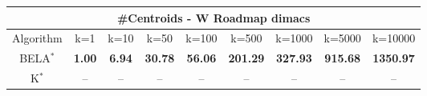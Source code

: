 \begin{tabular}{c|cccccccc}\toprule
\multicolumn{9}{c}{#Centroids - W Roadmap dimacs}\\ \midrule
Algorithm & k=1 & k=10 & k=50 & k=100 & k=500 & k=1000 & k=5000 & k=10000 \\ \midrule
BELA$^*$ & \textbf{1.00} & \textbf{6.94} & \textbf{30.78} & \textbf{56.06} & \textbf{201.29} & \textbf{327.93} & \textbf{915.68} & \textbf{1350.97} \\
K$^*$ & -- & -- & -- & -- & -- & -- & -- & -- \\ \bottomrule 
\end{tabular}
